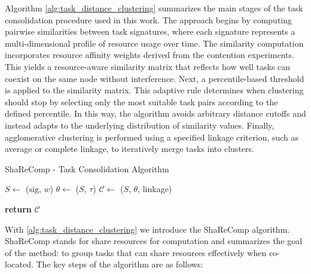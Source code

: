 Algorithm \ref{alg:task_distance_clustering} summarizes the main stages of the task consolidation procedure used in this work. The approach begins by computing pairwise similarities between task signatures, where each signature represents a multi-dimensional profile of resource usage over time. The similarity computation incorporates resource affinity weights derived from the contention experiments. This yields a resource-aware similarity matrix that reflects how well tasks can coexist on the same node without interference.
Next, a percentile-based threshold is applied to the similarity matrix. This adaptive rule determines when clustering should stop by selecting only the most suitable task pairs according to the defined percentile. In this way, the algorithm avoids arbitrary distance cutoffs and instead adapts to the underlying distribution of similarity values.
Finally, agglomerative clustering is performed using a specified linkage criterion, such as average or complete linkage, to iteratively merge tasks into clusters.

\begin{algorithm}[H]
    \caption{ShaReComp - Task Consolidation Algorithm}
    \label{alg:task_distance_clustering}


    $S \gets$ \Sim($\mathrm{sig}$, $w$) 
    $\theta \gets$ \Thresh($S$, $\tau$) 
    $\mathcal{C} \gets$ \Merge($S$, $\theta$, linkage) 

    \textbf{return } $\mathcal{C}$
\end{algorithm}

With \ref{alg:task_distance_clustering} we introduce the ShaReComp algorithm. ShaReComp stands for share resources for computation and summarizes the goal of the method: to group tasks that can share resources effectively when co-located.
The key steps of the algorithm are as follows:


